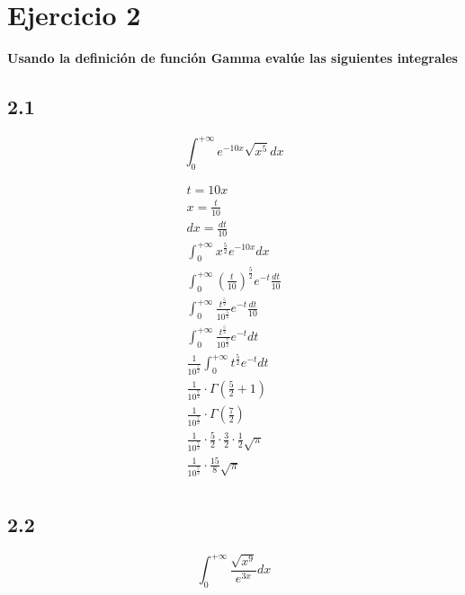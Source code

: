 \section*{Ejercicio 2}
\noindent\textbf{Usando la definición de función Gamma evalúe las siguientes integrales}

\subsection*{2.1}
\[
  \int_{0}^{+\infty} e^{-10x} \sqrt{x^{5}} dx
\]

\begin{gather*}
  t = 10x \\
  x = \frac{t}{10} \\
  dx = \frac{dt}{10} \\
  \int_{0}^{+\infty} x^{\frac{5}{2}}e^{-10x} dx \\
  \int_{0}^{+\infty} \left(\frac{t}{10}\right)^{\frac{5}{2}}e^{-t} \frac{dt}{10} \\
  \int_{0}^{+\infty} \frac{t^{\frac{5}{2}}}{10^{\frac{5}{2}}}e^{-t} \frac{dt}{10} \\
  \int_{0}^{+\infty} \frac{t^{\frac{5}{2}}}{10^{\frac{7}{2}}}e^{-t} dt \\
  \frac{1}{10^{\frac{7}{2}}} \int_{0}^{+\infty} t^{\frac{5}{2}}e^{-t} dt \\
  \frac{1}{10^{\frac{7}{2}}} \cdot \Gamma\left(\frac{5}{2} + 1\right) \\
  \frac{1}{10^{\frac{7}{2}}} \cdot \Gamma\left(\frac{7}{2}\right) \\
  \frac{1}{10^{\frac{7}{2}}} \cdot \frac{5}{2} \cdot \frac{3}{2} \cdot \frac{1}{2} \sqrt{\pi} \\
  \frac{1}{10^{\frac{7}{2}}} \cdot \frac{15}{8} \sqrt{\pi} \\
\end{gather*}



\subsection*{2.2}
\[
  \int_{0}^{+\infty} \frac{\sqrt{x^9}}{e^{3x}} dx
\]

